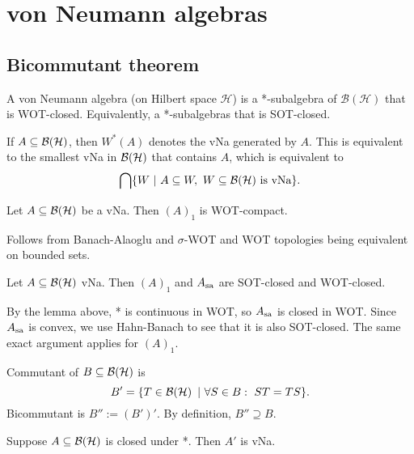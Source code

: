 \section{von Neumann algebras}

\subsection{Bicommutant theorem}

\begin{definition}
  A von Neumann algebra (on Hilbert space $\mathcal{H}$) is a *-subalgebra of $\mathcal{B}(\mathcal{H})$
  that is WOT-closed. Equivalently, a *-subalgebras that is SOT-closed.
\end{definition}

\begin{definition}
  If $A \subseteq \operatorname{\mathcal{B} (\mathcal{H})}$, then $W^* (A)$ denotes the vNa generated by $A$.
  This is equivalent to the smallest vNa in $\operatorname{\mathcal{B} (\mathcal{H})}$ that contains $A$, which is equivalent to 
  $$\bigcap \{W \ |\ A \subseteq W,\ \textrm{$W \subseteq \operatorname{\mathcal{B} (\mathcal{H})}$ is vNa} \}.$$
\end{definition}

\begin{lemma}
  Let $A \subseteq \operatorname{\mathcal{B} (\mathcal{H})}$ be a vNa. Then $(A)_1$ is WOT-compact.
\end{lemma}

\begin{myproof}
  Follows from Banach-Alaoglu and $\sigma$-WOT and WOT topologies being equivalent on bounded sets.
\end{myproof}

\begin{corollary}
  Let $A \subseteq \operatorname{\mathcal{B} (\mathcal{H})}$ vNa. Then $(A)_1$ and $A_{\operatorname{sa}}$ are SOT-closed and WOT-closed.
\end{corollary}

\begin{myproof}
  By the lemma above, * is continuous in WOT, so $A_{\operatorname{sa}}$ is closed in WOT.
  Since $A_{\operatorname{sa}}$ is convex, we use Hahn-Banach to see that it is also SOT-closed.
  The same exact argument applies for $(A)_1$.
\end{myproof}

\begin{definition}
  Commutant of $B \subseteq \operatorname{\mathcal{B} (\mathcal{H})}$ is 
  $$B' = \{T \in \operatorname{\mathcal{B} (\mathcal{H})}\ |\ \forall S \in B:\ ST = TS\}.$$
  Bicommutant is $B'' := (B')'$. By definition, $B'' \supseteq B$.
\end{definition}

\begin{theorem}
  Suppose $A \subseteq \operatorname{\mathcal{B} (\mathcal{H})}$ is closed under *. Then $A'$ is vNa.
\end{theorem}

